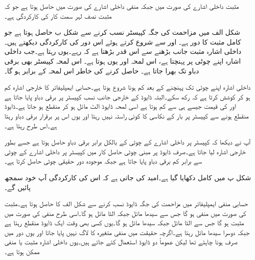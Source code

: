 مثبت داخلی اشارے کی صورت میں  جبکہ منفی داخلی اشارے کی صورت میں  حاصل ہوتا ہے جو کہ مثبت نصف لہر سمت کار کی کارکردگی ہے۔

شکل  الف میں مزاحمت کی جگہ کپیسٹر نسب کرنے سے شکل  ب حاصل ہوتا ہے جو کامل مثبت  کا دور ہے۔ اور  سے شروع کرتے ہوئے اس دور کی کارکردگی دیکھتے ہیں۔داخلی اشارہ مثبت جانب بڑھنے سے  اس قدر بڑھتا ہے کہ  رہے۔یوں  رہتا ہے۔جب داخلی اشارہ اپنے چوٹی  پر پہنچتا ہے، اس لمحہ  اور یوں  ہوتا ہے۔ اس لمحہ کپیسٹر بھی  برقی دباو تک بھرا جاتا ہے۔ حاصل کرنے کی خاطر اس لمحہ  کے برابر ہو گا۔

داخلی اشارہ اپنے چوٹی تک پہنچنے کے بعد کم ہونا شروع ہوتا ہے۔حسابی ایمپلیفائر کا خارجی اشارہ  کم ہو کر کوشش کرتا ہے کہ  رکھ سکے۔البتہ ڈایوڈ کے خارجی جانب نسب کپیسٹر پر  برقی دباو پایا جاتا ہے اور  کی قیمت جیسے ہی  سے کم ہوتا ہے اسی لمحہ ڈایوڈ الٹ مائل ہو کر منقطع ہو جاتا ہے۔ڈایوڈ منقطع ہونے سے کپیسٹر پر بار کے نکاسی  کا کوئی راستہ نہیں رہتا اور یوں اس پر برقرار  برقی دباو رہتا ہے۔اس طرح  رہتا ہے۔ 

آپ نے دیکھا کہ کپیسٹر پر داخلی اشارے کے چوٹی کے بالکل برابر برقی دباو حاصل ہوتا ہے جسے بطور خارجی اشارہ  لیا جاتا ہے۔صرف ڈایوڈ پر مبنی چوٹی حاصل کار میں کپیسٹر پر داخلی اشارے کے چوٹی سے  برابر کم برقی دباو پایا جاتا ہے جبکہ موجودہ دور حقیقی چوٹی حاصل کرتا ہے۔

شکل  پ میں کامل  دکھایا گیا ہے۔امید کی جاتی ہے کہ اس کی کارکردگی  آپ خود سمجھ پائیں گے۔

حسابی منفی ایمپلیفائر میں مزاحمت کی جگہ ڈایوڈ نسب کرنے سے شکل  الف کا  حاصل ہوتا ہے۔مثبت  کی صورت میں  منفی ہو گا جس سے  سیدھا مائل جبکہ  الٹا مائل ہو گا۔اسی طرح منفی   کی صورت میں  مثبت ہو گا جس سے  الٹا مائل جبکہ  سیدھا مائل ہو گا۔یوں کسی بھی وقت ایک ڈایوڈ منقطع رہتا ہے جبکہ دوسرا سیدھا مائل رہتا ہے۔اگرچہ حقیقت میں منفی متغیرہ کا لاگ نہیں پایا جاتا اور یوں دور میں صرف  ہونا چاہئے تھا لیکن عموماً دو ڈایوڈ استعمال کئے جاتے ہیں۔یوں داخلی اشارہ  مثبت یا منفی ممکن ہوتا ہے۔

